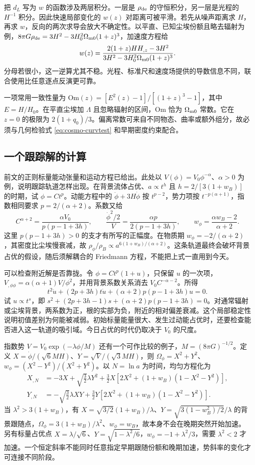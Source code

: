 把 $d_L$ 写为 $w$ 的函数涉及两层积分。一层是 $\rho_{\rm de}$ 的守恒积分，另一层是光程的 $H^{-1}$ 积分。因此快速局部变化的 $w(z)$ 对距离可被平滑。若先从噪声距离求 $H$，再求 $w$，反向的两次求导会放大不确定性。以平直、已知尘埃份额且略去辐射为例，$8\pi G\rho_{\rm de}=3H^2-3H_0^2\Omega_{\rm m0}(1+z)^3$，加速度方程给
\[
 w(z)=\frac{2(1+z)H H_{,z}-3H^2}
 {3H^2-3H_0^2\Omega_{\rm m0}(1+z)^3}.
\]
分母若很小，这一逆算尤其不稳。光程、标准尺和速度场提供的导数信息不同，联合使用比任意逐点反演更可靠。

一项常用一致性量为 $\mathrm{Om}(z)=[E^2(z)-1]/[(1+z)^3-1]$，其中 $E=H/H_0$。在平直尘埃加 $\Lambda$ 且忽略辐射的区间，$\mathrm{Om}$ 恰为 $\Omega_{\rm m0}$ 常数。它在 $z=0$ 的极限为 $2(1+q_0)/3$。偏离常数可来自不同物态、曲率或额外组分，故必须与几何检验式 \eqref{eq:cosmo-curvtest} 和早期密度约束配合。

\subsection{一个跟踪解的计算}

前文的正则标量能动张量和运动方程已给出。此处以 $V(\phi)=V_0\phi^{-\alpha}$、$\alpha>0$ 为例，说明跟踪轨道怎样出现。在背景流体占优、$a\propto t^h$ 且 $h=2/[3(1+w_B)]$ 的时期，试 $\phi=Ct^p$。动能方程中的 $\ddot\phi+3H\dot\phi$ 按 $t^{p-2}$，势力项按 $t^{-p(\alpha+1)}$，指数相同要求 $p=2/(\alpha+2)$。系数又给
\[
 C^{\alpha+2}=\frac{\alpha V_0}{p(p-1+3h)},\qquad
 \frac{\dot\phi^2/2}{V}=\frac{\alpha p}{2(p-1+3h)},\qquad
 w_\phi=\frac{\alpha w_B-2}{\alpha+2}.
\]
这里 $p(p-1+3h)>0$ 的支才有所写的正幅度。在物质期 $w_\phi=-2/(\alpha+2)$，其密度比尘埃慢衰减，故 $\rho_\phi/\rho_B\propto a^{6(1+w_B)/(\alpha+2)}$。这条轨道最终会破坏背景占优的假设，随后须解耦合的 Friedmann 方程，不能把上式一直用到今天。

可以检查附近解是否靠拢。令 $\phi=Ct^p(1+u)$，只保留 $u$ 的一次项，$V_{,\phi\phi}=\alpha(\alpha+1)V/\phi^2$，并用背景系数关系消去 $V_0C^{-\alpha-2}$。所得
\[
 t^2\ddot u+(2p+3h)t\dot u
           +(\alpha+2)p(p-1+3h)u=0.
\]
试 $u\propto t^s$，即 $s^2+(2p+3h-1)s+(\alpha+2)p(p-1+3h)=0$。对通常辐射或尘埃背景，两系数为正，根的实部为负，附近的相对偏差衰减。这个局部稳定性说明初值差别为何能被减弱。初始标量能量很大、发生过动能占优时，还要检查能否进入这一轨道的吸引域。今日占优的时代仍取决于 $V_0$ 的尺度。

指数势 $V=V_0\exp(-\lambda\phi/M)$ 还有一个可作比较的例子，$M=(8\pi G)^{-1/2}$。定义 $X=\dot\phi/(\sqrt6 MH)$、$Y=\sqrt V/(\sqrt3 MH)$，则 $\Omega_\phi=X^2+Y^2$、$w_\phi=(X^2-Y^2)/(X^2+Y^2)$。以 $N=\ln a$ 为时间，均匀方程化为
\begin{align*}
 X_{,N}&=-3X+\sqrt{\frac32}\lambda Y^2+
 \frac32X[2X^2+(1+w_B)(1-X^2-Y^2)],\\
 Y_{,N}&=-\sqrt{\frac32}\lambda XY+
 \frac32Y[2X^2+(1+w_B)(1-X^2-Y^2)].
\end{align*}
当 $\lambda^2>3(1+w_B)$，有 $X=\sqrt{3/2}(1+w_B)/\lambda$、$Y=\sqrt{3(1-w_B^2)/2}/\lambda$ 的背景跟随点，$\Omega_\phi=3(1+w_B)/\lambda^2$、$w_\phi=w_B$，故本身不会在晚期突然开始加速。另有标量占优点 $X=\lambda/\sqrt6$、$Y=\sqrt{1-\lambda^2/6}$，$w_\phi=-1+\lambda^2/3$，需要 $\lambda^2<2$ 才加速。一个恒定斜率不能同时任意指定早期跟随份额和晚期加速，势斜率的变化才可连接不同阶段。

